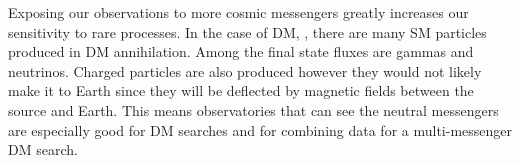 \begin{figure}[h]
\end{figure}

Exposing our observations to more cosmic messengers greatly increases our sensitivity to rare processes.
In the case of DM, ,  there are many SM particles produced in DM annihilation.
Among the final state fluxes are gammas and neutrinos.
Charged particles are also produced however they would not likely make it to Earth since they will be deflected by magnetic fields between the source and Earth.
This means observatories that can see the neutral messengers are especially good for DM searches and for combining data for a multi-messenger DM search.

